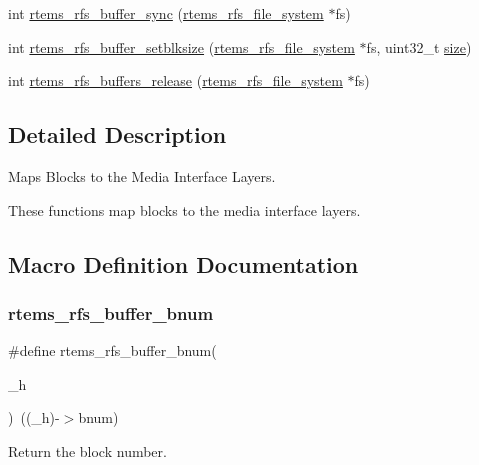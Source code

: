 \begin{DoxyCompactItemize}
\item 
int \mbox{\hyperlink{rtems-rfs-buffer_8h_ae563bb0d8d88241eba145f94ab3056f7}{rtems\+\_\+rfs\+\_\+buffer\+\_\+sync}} (\mbox{\hyperlink{struct__rtems__rfs__file__system}{rtems\+\_\+rfs\+\_\+file\+\_\+system}} $\ast$fs)
\item 
int \mbox{\hyperlink{rtems-rfs-buffer_8h_ab9a25f519ce861f9781f99faee5c903e}{rtems\+\_\+rfs\+\_\+buffer\+\_\+setblksize}} (\mbox{\hyperlink{struct__rtems__rfs__file__system}{rtems\+\_\+rfs\+\_\+file\+\_\+system}} $\ast$fs, uint32\+\_\+t \mbox{\hyperlink{sun4u_2tte_8h_a245260f6f74972558f61b85227df5aae}{size}})
\item 
int \mbox{\hyperlink{rtems-rfs-buffer_8h_a26b599aacf6e9230ab77cf47d9fad0d9}{rtems\+\_\+rfs\+\_\+buffers\+\_\+release}} (\mbox{\hyperlink{struct__rtems__rfs__file__system}{rtems\+\_\+rfs\+\_\+file\+\_\+system}} $\ast$fs)
\end{DoxyCompactItemize}


\subsection{Detailed Description}
Maps Blocks to the Media Interface Layers. 

These functions map blocks to the media interface layers. 

\subsection{Macro Definition Documentation}
\mbox{\label{rtems-rfs-buffer_8h_a033ed348d383f050ca39826a7d651b6b}} 
\subsubsection{\texorpdfstring{rtems\_rfs\_buffer\_bnum}{rtems\_rfs\_buffer\_bnum}}
{\footnotesize\ttfamily \#define rtems\+\_\+rfs\+\_\+buffer\+\_\+bnum(\begin{DoxyParamCaption}\item[{}]{\+\_\+h }\end{DoxyParamCaption})~((\+\_\+h)-\/$>$bnum)}

Return the block number. \mbox{\label{rtems-rfs-buffer_8h_aeb8816b42da7435346c907b381188402}} 
